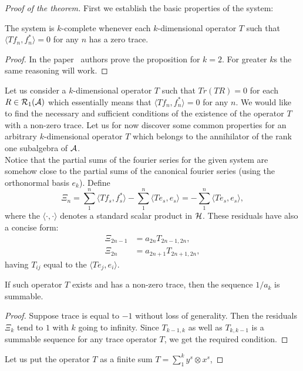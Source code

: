   \begin{proof}[Proof of the theorem]
    First we establish the basic properties of the system:
    \begin{prop}
      The system is $k$-complete whenever each $k$-dimensional operator $T$ 
      such that $\langle Tf_n, f_n^* \rangle = 0$ for any $n$ has a zero trace.
    \end{prop}
    \begin{proof}
      In the paper~\cite{katavolos} authors prove the proposition for $k = 2$. For greater $k$s the same reasoning will work.
    \end{proof}
    Let us consider a $k$-dimensional operator $T$ such that $Tr(TR) = 0$ for each $R \in \cal{R}_1(\cal{A})$ which essentially means that
      $\langle Tf_n, f_n^* \rangle = 0$ for any $n$. 
    We would like to find the necessary and sufficient conditions of the existence of the operator $T$ with a non-zero trace.
    Let us for now discover some common properties for an arbitrary $k$-dimensional operator $T$ which belongs to the annihilator of the rank one subalgebra of $\cal{A}$.\\
    Notice that the partial sums of the fourier series for the given system are somehow close to the
      partial sums of the canonical fourier series (using the orthonormal basis $e_k$). Define
    \[
      \Xi_n = \sum_1^n \langle Tf_s, f_s^* \rangle - \sum_1^n \langle Te_s, e_s \rangle = -\sum_1^n \langle Te_s, e_s \rangle,
    \]
      where the $\langle \cdot, \cdot\rangle$ denotes a standard scalar product in $\cal{H}$. 
    These residuals have also a concise form:
    \begin{align*}
      \Xi_{2n-1} &= a_{2n}T_{2n - 1, 2n},\\
      \Xi_{2n} &= a_{2n + 1}T_{2n + 1, 2n},
    \end{align*}
      having $T_{ij}$ equal to the $\langle Te_j, e_i \rangle$.
    \begin{remark}
      If such operator $T$ exists and has a non-zero trace, then the sequence $1/a_k$ is summable.
    \end{remark}
    \begin{proof}
      Suppose trace is equal to $-1$ without loss of generality.
      Then the residuals $\Xi_k$ tend to $1$ with $k$ going to infinity. Since $T_{k-1, k}$ as well as $T_{k, k-1}$
        is a summable sequence for any trace operator $T$, we get the required condition.
    \end{proof}
    Let us put the operator $T$ as a finite sum $T = \sum_1^k y^s \otimes x^s$,

\end{proof}
